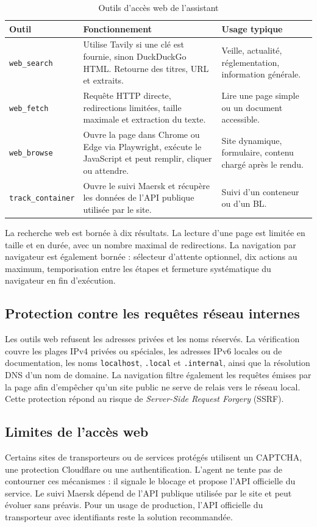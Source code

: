 \documentclass[12pt,a4paper,oneside]{report}
\newcommand{\code}[1]{\texttt{#1}}
\begin{document}
\begin{table}[H]\centering
\caption{Outils d'accès web de l'assistant}
\begin{tabularx}{\textwidth}{p{3cm}Y Y}
\toprule \textbf{Outil} & \textbf{Fonctionnement} & \textbf{Usage typique}\\ \midrule
\code{web\_search} & Utilise Tavily si une clé est fournie, sinon DuckDuckGo HTML. Retourne des titres, URL et extraits. & Veille, actualité, réglementation, information générale.\\
\code{web\_fetch} & Requête HTTP directe, redirections limitées, taille maximale et extraction du texte. & Lire une page simple ou un document accessible.\\
\code{web\_browse} & Ouvre la page dans Chrome ou Edge via Playwright, exécute le JavaScript et peut remplir, cliquer ou attendre. & Site dynamique, formulaire, contenu chargé après le rendu.\\
\code{track\_container} & Ouvre le suivi Maersk et récupère les données de l'API publique utilisée par le site. & Suivi d'un conteneur ou d'un BL.\\
\bottomrule
\end{tabularx}
\end{table}

La recherche web est bornée à dix résultats. La lecture d'une page est limitée en taille et en durée, avec un nombre maximal de redirections. La navigation par navigateur est également bornée : sélecteur d'attente optionnel, dix actions au maximum, temporisation entre les étapes et fermeture systématique du navigateur en fin d'exécution.

\subsection{Protection contre les requêtes réseau internes}
Les outils web refusent les adresses privées et les noms réservés. La vérification couvre les plages IPv4 privées ou spéciales, les adresses IPv6 locales ou de documentation, les noms \code{localhost}, \code{.local} et \code{.internal}, ainsi que la résolution DNS d'un nom de domaine. La navigation filtre également les requêtes émises par la page afin d'empêcher qu'un site public ne serve de relais vers le réseau local. Cette protection répond au risque de \emph{Server-Side Request Forgery} (SSRF).

\subsection{Limites de l'accès web}
Certains sites de transporteurs ou de services protégés utilisent un CAPTCHA, une protection Cloudflare ou une authentification. L'agent ne tente pas de contourner ces mécanismes : il signale le blocage et propose l'API officielle du service. Le suivi Maersk dépend de l'API publique utilisée par le site et peut évoluer sans préavis. Pour un usage de production, l'API officielle du transporteur avec identifiants reste la solution recommandée.
\end{document}
